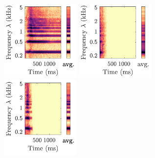 \documentclass{bmcart}
\begin{document}
\begin{backmatter}
\begin{figure}
\hspace{12mm}
\hspace{22mm}
\hspace{15mm}
\vspace{1cm}


\includegraphics[height=4cm]{Fl-sfz-C4-fp_scalogram.pdf}
\hspace{8mm}
\includegraphics[trim=35 0 0 0, clip, height=4cm]{Fl-key-cl-C4-f_scalogram.pdf}
\hspace{12mm}
\includegraphics[trim=35 0 0 0, clip, height=4cm]{Fl-stacc-C4-mf_scalogram.pdf}



\end{figure}
\end{backmatter}
\end{document}
